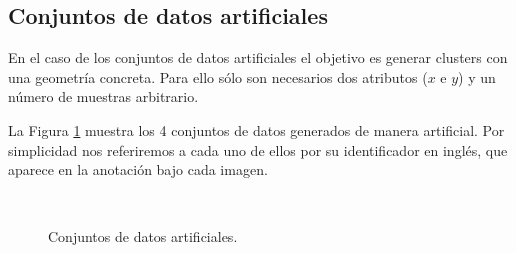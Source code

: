 \subsection{Conjuntos de datos artificiales} \label{ArtifDataset}

En el caso de los conjuntos de datos artificiales el objetivo es generar clusters con una geometría concreta. Para ello sólo son necesarios dos atributos ($x$ e $y$) y un número de muestras arbitrario.

La Figura \ref{fig:figure22} muestra los 4 conjuntos de datos generados de manera artificial. Por simplicidad nos referiremos a cada uno de ellos por su identificador en inglés, que aparece en la anotación bajo cada imagen.

\begin{figure}[bth]
	\myfloatalign
	\\
	\caption{Conjuntos de datos artificiales.}\label{fig:figure22}
\end{figure}

